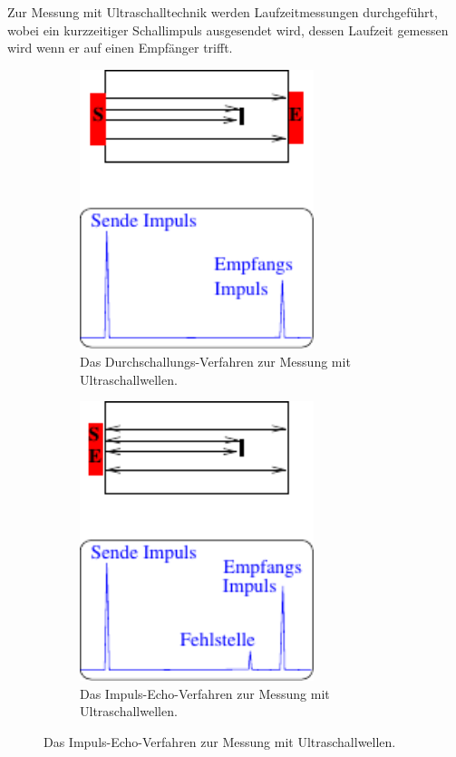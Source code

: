     Zur Messung mit Ultraschalltechnik werden Laufzeitmessungen durchgeführt,
    wobei ein kurzzeitiger Schallimpuls ausgesendet wird,
    dessen Laufzeit gemessen wird wenn er auf einen Empfänger trifft.\\
    \clearpage
    \begin{figure}
        \centering
        \begin{subfigure}{0.48\textwidth}
            \centering
            \includegraphics[width=0.75\textwidth]{content/img/Abb_1a.pdf}
            \caption{Das Durchschallungs-Verfahren zur Messung mit Ultraschallwellen.}
            \label{fig:durchschallung}
        \end{subfigure}
        \begin{subfigure}{0.48\textwidth}
            \centering
            \includegraphics[width=0.75\textwidth]{content/img/Abb_1b.pdf}
            \caption{Das Impuls-Echo-Verfahren zur Messung mit Ultraschallwellen.}
            \label{fig:impuls_echo}
        \end{subfigure}
    \end{figure}

